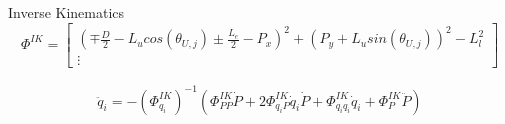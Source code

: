 Inverse Kinematics
\begin{equation}
    \Phi^{IK}=
    \begin{bmatrix}
     (\mp \frac{D}{2}-L_u cos(\theta_{U,j})\pm\frac{L_e}{2}-P_x)^2+(P_y+L_u sin(\theta_{U,j}))^2-L_l^2 \\
         \vdots
    \end{bmatrix}
\end{equation}

\begin{equation}
\begin{aligned}
    \ddot{q}_i=-(\Phi^{IK}_{q_i})^{-1}(\Phi^{IK}_{PP}\dot{P} +2\Phi^{IK}_{q_iP}\dot{q}_i\dot{P} + \Phi^{IK}_{q_i q_i}\dot{q}_i +\Phi^{IK}_{P}\ddot{P} )
\end{aligned}
\end{equation}


